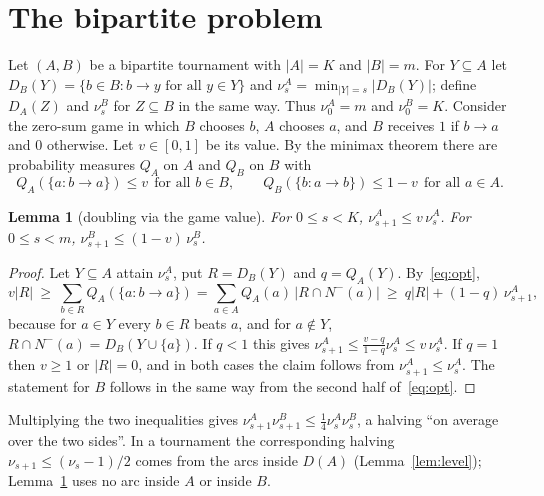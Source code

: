 \documentclass[11pt]{amsart}
\newtheorem{lemma}[theorem]{Lemma}
\theoremstyle{definition}
\theoremstyle{remark}
\newcommand{\D}{D}
\newcommand{\Nin}{N^{-}}
\newcommand{\abs}[1]{\lvert #1\rvert}
\begin{document}
\section{The bipartite problem}\label{sec:bip}

Let $(A,B)$ be a bipartite tournament with $\abs A=K$ and $\abs B=m$. For $Y\subseteq A$ let
$\D_B(Y)=\{b\in B: b\to y\text{ for all }y\in Y\}$ and $\nu^A_s=\min_{\abs Y=s}\abs{\D_B(Y)}$; define $\D_A(Z)$ and $\nu^B_s$ for
$Z\subseteq B$ in the same way. Thus $\nu^A_0=m$ and $\nu^B_0=K$. Consider the zero-sum game in which $B$ chooses $b$, $A$ chooses $a$,
and $B$ receives $1$ if $b\to a$ and $0$ otherwise. Let $v\in[0,1]$ be its value. By the minimax theorem there are probability
measures $Q_A$ on $A$ and $Q_B$ on $B$ with
\begin{equation}\label{eq:opt}
  Q_A(\{a:b\to a\})\le v\ \ \text{for all }b\in B,\qquad Q_B(\{b:a\to b\})\le 1-v\ \ \text{for all }a\in A.
\end{equation}

\begin{lemma}[doubling via the game value]\label{lem:game}
For $0\le s<K$, $\nu^A_{s+1}\le v\,\nu^A_s$. For $0\le s<m$, $\nu^B_{s+1}\le(1-v)\,\nu^B_s$.
\end{lemma}

\begin{proof}
Let $Y\subseteq A$ attain $\nu^A_s$, put $R=\D_B(Y)$ and $q=Q_A(Y)$. By~\eqref{eq:opt},
\[
  v\abs R\ \ge\ \sum_{b\in R}Q_A(\{a:b\to a\})=\sum_{a\in A}Q_A(a)\,\abs{R\cap\Nin(a)}\ \ge\ q\abs R+(1-q)\,\nu^A_{s+1},
\]
because for $a\in Y$ every $b\in R$ beats $a$, and for $a\notin Y$, $R\cap\Nin(a)=\D_B(Y\cup\{a\})$. If $q<1$ this gives
$\nu^A_{s+1}\le\frac{v-q}{1-q}\nu^A_s\le v\,\nu^A_s$. If $q=1$ then $v\ge1$ or $\abs R=0$, and in both cases the claim follows
from $\nu^A_{s+1}\le\nu^A_s$. The statement for $B$ follows in the same way from the second half of~\eqref{eq:opt}.
\end{proof}

Multiplying the two inequalities gives $\nu^A_{s+1}\nu^B_{s+1}\le\frac14\nu^A_s\nu^B_s$, a halving ``on average over the two
sides''. In a tournament the corresponding halving $\nu_{s+1}\le(\nu_s-1)/2$ comes from the arcs inside $\D(A)$
(Lemma~\ref{lem:level}); Lemma~\ref{lem:game} uses no arc inside $A$ or inside $B$.
\end{document}

